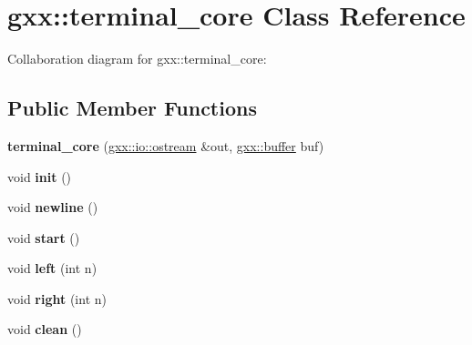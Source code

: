 \hypertarget{classgxx_1_1terminal__core}{}\section{gxx\+:\+:terminal\+\_\+core Class Reference}
\label{classgxx_1_1terminal__core}


Collaboration diagram for gxx\+:\+:terminal\+\_\+core\+:
\subsection*{Public Member Functions}
\begin{DoxyCompactItemize}
\item 
{\bfseries terminal\+\_\+core} (\hyperlink{classgxx_1_1io_1_1ostream}{gxx\+::io\+::ostream} \&out, \hyperlink{classgxx_1_1buffer}{gxx\+::buffer} buf)\hypertarget{classgxx_1_1terminal__core_a8cfa6715728dc02f92eb54fc2c6b8858}{}\label{classgxx_1_1terminal__core_a8cfa6715728dc02f92eb54fc2c6b8858}

\item 
void {\bfseries init} ()\hypertarget{classgxx_1_1terminal__core_a6e6caad870e41f1b64823dacc8e60533}{}\label{classgxx_1_1terminal__core_a6e6caad870e41f1b64823dacc8e60533}

\item 
void {\bfseries newline} ()\hypertarget{classgxx_1_1terminal__core_aabb78cfa5ea8ed3d461aef576d39dc73}{}\label{classgxx_1_1terminal__core_aabb78cfa5ea8ed3d461aef576d39dc73}

\item 
void {\bfseries start} ()\hypertarget{classgxx_1_1terminal__core_a52fd6fc8f4c6cb96f8d3f963fe6fc112}{}\label{classgxx_1_1terminal__core_a52fd6fc8f4c6cb96f8d3f963fe6fc112}

\item 
void {\bfseries left} (int n)\hypertarget{classgxx_1_1terminal__core_a06608cf867c0878701bb8ae890ea91e9}{}\label{classgxx_1_1terminal__core_a06608cf867c0878701bb8ae890ea91e9}

\item 
void {\bfseries right} (int n)\hypertarget{classgxx_1_1terminal__core_a2fcfc94977f8d659da46c6ddd784802a}{}\label{classgxx_1_1terminal__core_a2fcfc94977f8d659da46c6ddd784802a}

\item 
void {\bfseries clean} ()\hypertarget{classgxx_1_1terminal__core_a9f3e65e794d48e22bf0879b56b56e7dd}{}\label{classgxx_1_1terminal__core_a9f3e65e794d48e22bf0879b56b56e7dd}


\end{DoxyCompactItemize}
